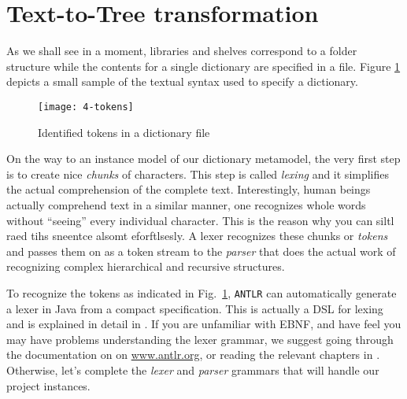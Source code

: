 \newpage
\section{Text-to-Tree transformation}
\genHeader

As we shall see in a moment, libraries and shelves correspond to a folder structure while the contents for a single dictionary are specified in a file.
Figure \ref{fig:moca-4-Tokens} depicts a small sample of the textual syntax used to specify a dictionary. 

\begin{figure}[!htbp]
\begin{center}
 \texttt{[image: 4-tokens]}
  \caption{Identified tokens in a dictionary file}
  \label{fig:moca-4-Tokens}
\end{center}
\end{figure}

On the way to an instance model of our dictionary metamodel, the very first step is to create nice \emph{chunks} of characters. This step is called
\emph{lexing} and it simplifies the actual comprehension of the complete text. Interestingly, human beings actually comprehend text in a similar manner, one
recognizes whole words without ``seeing'' every individual character. This is the reason why you can siltl raed tihs sneentce alsomt eforftlsesly. A lexer
recognizes these chunks or \emph{tokens} and passes them on as a token stream to the \emph{parser} that does the actual work of recognizing complex
hierarchical and recursive structures.
   
To recognize the tokens as indicated in Fig.~\ref{fig:moca-4-Tokens}, \texttt{ANTLR} can automatically generate a lexer in Java from a compact specification.
This is actually a DSL for lexing and is explained in detail in \cite{ANTLR}. If you are unfamiliar with EBNF, and have feel you may have problems understanding
the lexer grammar, we suggest going through the documentation on on \url{www.antlr.org}, or reading the relevant chapters in \cite{ANTLR}. Otherwise, let's
complete the \emph{lexer} and \emph{parser} grammars that will handle our project instances.

